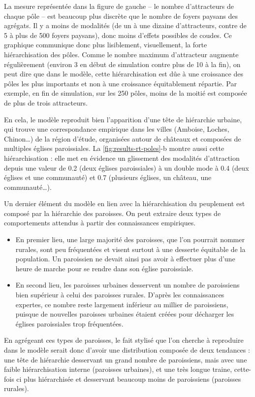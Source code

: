 La mesure représentée dans la figure de gauche -- le nombre d'attracteurs de chaque pôle -- est beaucoup plus \og discrète\fg{} que le nombre de foyers paysans des agrégats.
Il y a moins de modalités (de un à une dizaine d'attracteurs, contre de 5 à plus de 500 foyers paysans), donc moins d'effets possibles de coudes.
Ce graphique communique donc plus lisiblement, visuellement, la forte hiérarchisation des pôles.
Comme le nombre maximum d'attracteur augmente régulièrement (environ 3 en début de simulation contre plus de 10 à la fin), on peut dire que dans le modèle, cette hiérarchisation est dûe à une croissance des pôles les plus importants et non à une croissance équitablement répartie.
Par exemple, en fin de simulation, sur les 250 pôles, moins de la moitié est composée de plus de trois attracteurs.

En cela, le modèle reproduit bien l'apparition d'une tête de hiérarchie urbaine, qui trouve une correspondance empirique dans les villes (Amboise, Loches, Chinon\ldots) de la région d'étude, organisées autour de châteaux et composées de multiples églises paroissiales.
La \cref{fig:results-rt-poles}-b montre aussi cette hiérarchisation : elle met en évidence un glissement des modalités d'attraction depuis une valeur de 0.2 (deux églises paroissiales) à un double mode à 0.4 (deux églises et une communauté) et 0.7 (plusieurs églises, un château, une communauté\ldots).


Un dernier élément du modèle en lien avec la hiérarchisation du peuplement est composé par la hiérarchie des paroisses.
On peut extraire deux types de comportements attendus à partir des connaissances empiriques.
\begin{itemize}
	\item En premier lieu, une large majorité des paroisses, que l'on pourrait nommer \og rurales\fg{}, sont peu fréquentées et visent surtout à une desserte équitable de la population.
	Un paroissien ne devait ainsi pas avoir à effectuer plus d'une heure de marche pour se rendre dans son église paroissiale.
	\item En second lieu, les paroisses \og urbaines\fg{} desservent un nombre de paroissiens bien supérieur à celui des paroisses rurales.
	D'après les connaissances expertes, ce nombre reste largement inférieur au millier de paroissiens, puisque de nouvelles paroisses urbaines étaient créées pour décharger les églises paroissiales trop fréquentées.
\end{itemize}
En agrégeant ces types de paroisses, le fait stylisé que l'on cherche à reproduire dans le modèle serait donc d'avoir une distribution composée de deux tendances : une tête de hiérarchie desservant un grand nombre de paroissiens, mais avec une faible hiérarchisation interne (paroisses urbaines), et une très longue traine, cette-fois ci plus hiérarchisée et desservant beaucoup moins de paroissiens (paroisses rurales).


